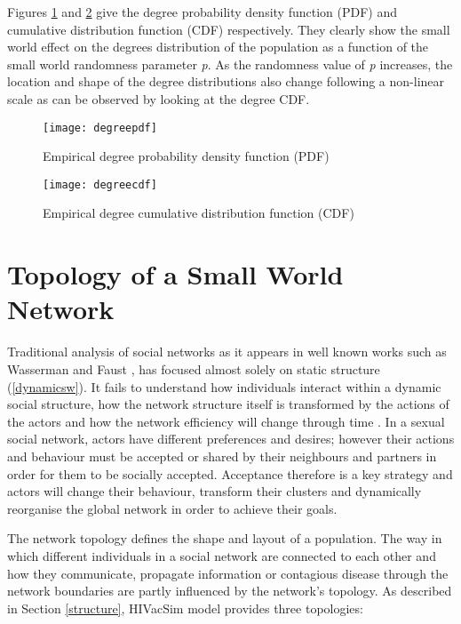 Figures \ref{degreepdf} and \ref{degreecdf} give the degree probability density function
(PDF) and cumulative distribution function (CDF) respectively. They clearly show the
small world effect on the degrees distribution of the population as a function of the
small world randomness parameter \emph{p}. As the randomness value of \emph{p} increases,
the location and shape of the degree distributions also change following a non-linear
scale as can be observed by looking at the degree CDF.

\begin{figure}[ht]
\texttt{[image: degreepdf]}
\caption{Empirical degree probability density function (PDF)} \label{degreepdf}
\end{figure}

\begin{figure}[ht]
\texttt{[image: degreecdf]}
\caption{Empirical degree cumulative distribution function (CDF)} \label{degreecdf}
\end{figure}
\clearpage

\section{Topology of a Small World Network}\label{topology}

Traditional analysis of social networks as it appears in well known works such as
Wasserman and Faust \cite{Wasserman1994}, has focused almost solely on static structure
(\ref{dynamicsw}). It fails to understand how individuals interact within a dynamic
social structure, how the network structure itself is transformed by the actions of the
actors and how the network efficiency will change through time \cite{Watts1999}. In a
sexual social network, actors have different preferences and desires; however their
actions and behaviour must be accepted or shared by their neighbours and partners in
order for them to be socially accepted. Acceptance therefore is a key strategy and actors
will change their behaviour, transform their clusters and dynamically reorganise the
global network in order to achieve their goals.

The network topology defines the shape and layout of a population. The way in which
different individuals in a social network are connected to each other and how they
communicate, propagate information or contagious disease through the network boundaries
are partly influenced by the network's topology. As described in Section \ref{structure},
HIVacSim model provides three topologies:

